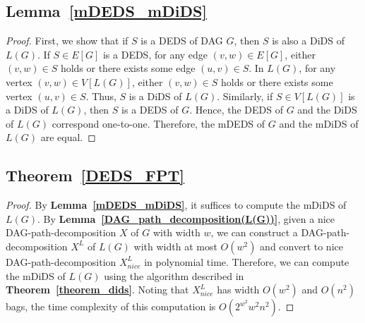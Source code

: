 \documentclass[runningheads]{llncs}
\theoremstyle{plain}
\theoremstyle{definition}
\begin{document}
\subsection{\textbf{Lemma~\ref{mDEDS_mDiDS}}}
\begin{proof}
    First, we show that if $S$ is a DEDS of DAG $G$, then $S$ is also a DiDS of $L(G)$. If $S\in E[G]$ is a DEDS, for any edge $(v, w) \in E[G]$, either $(v, w) \in S$ holds or there exists some edge $(u, v) \in S$. In $L(G)$, for any vertex $(v, w) \in V[L(G)]$, either $(v, w) \in S$ holds or there exists some vertex $(u, v) \in S$. Thus, $S$ is a DiDS of $L(G)$. Similarly, if $S \in V[L(G)]$ is a DiDS of $L(G)$, then $S$ is a DEDS of $G$. Hence, the DEDS of $G$ and the DiDS of $L(G)$ correspond one-to-one. Therefore, the mDEDS of $G$ and the mDiDS of $L(G)$ are equal.
\end{proof}


\subsection{\textbf{Theorem~\ref{DEDS_FPT}}}
\begin{proof}
    By \textbf{Lemma~\ref{mDEDS_mDiDS}}, it suffices to compute the mDiDS of $L(G)$. By \textbf{Lemma~\ref{DAG_path_decomposition(L(G))}}, given a nice DAG-path-decomposition $X$ of $G$ with width $w$, we can construct a DAG-path-decomposition $X^L$ of $L(G)$ with width at most $O(w^2)$ and convert to nice DAG-path-decomposition $X^L_{nice}$ in polynomial time. Therefore, we can compute the mDiDS of $L(G)$ using the algorithm described in \textbf{Theorem~\ref{theorem_dids}}. Noting that $X^L_{nice}$ has width $O(w^2)$ and $O(n^2)$ bags, the time complexity of this computation is $O(2^{w^2}w^2n^2)$.
\end{proof}
\end{document}
